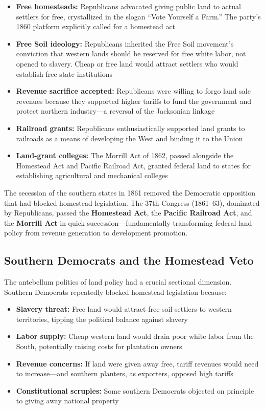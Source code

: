 \documentclass[12pt]{article}
\begin{document}
\begin{itemize}
\item \textbf{Free homesteads:} Republicans advocated giving public land to actual settlers for free, crystallized in the slogan ``Vote Yourself a Farm.''  The party's 1860 platform explicitly called for a homestead act
\item \textbf{Free Soil ideology:} Republicans inherited the Free Soil movement's conviction that western lands should be reserved for free white labor, not opened to slavery.  Cheap or free land would attract settlers who would establish free-state institutions
\item \textbf{Revenue sacrifice accepted:} Republicans were willing to forgo land sale revenues because they supported higher tariffs to fund the government and protect northern industry---a reversal of the Jacksonian linkage
\item \textbf{Railroad grants:} Republicans enthusiastically supported land grants to railroads as a means of developing the West and binding it to the Union
\item \textbf{Land-grant colleges:} The Morrill Act of 1862, passed alongside the Homestead Act and Pacific Railroad Act, granted federal land to states for establishing agricultural and mechanical colleges
\end{itemize}

The secession of the southern states in 1861 removed the Democratic opposition that had blocked homestead legislation.  The 37th Congress (1861--63), dominated by Republicans, passed the \textbf{Homestead Act}, the \textbf{Pacific Railroad Act}, and the \textbf{Morrill Act} in quick succession---fundamentally transforming federal land policy from revenue generation to development promotion.

\subsection{Southern Democrats and the Homestead Veto}

The antebellum politics of land policy had a crucial sectional dimension.  Southern Democrats repeatedly blocked homestead legislation because:

\begin{itemize}
\item \textbf{Slavery threat:} Free land would attract free-soil settlers to western territories, tipping the political balance against slavery
\item \textbf{Labor supply:} Cheap western land would drain poor white labor from the South, potentially raising costs for plantation owners
\item \textbf{Revenue concerns:} If land were given away free, tariff revenues would need to increase---and southern planters, as exporters, opposed high tariffs
\item \textbf{Constitutional scruples:} Some southern Democrats objected on principle to giving away national property
\end{itemize}
\end{document}
